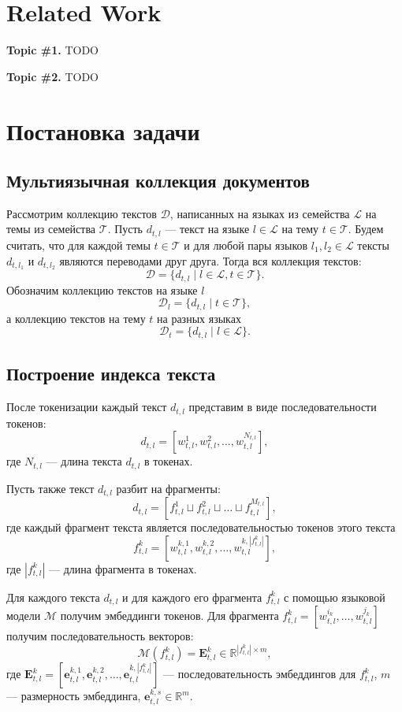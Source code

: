 \documentclass{article}
\begin{document}
\section{Related Work}\label{sec:rw}

\textbf{Topic \#1.}
TODO

\textbf{Topic \#2.}
TODO

\section{Постановка задачи}\label{sec:problem_statement}

\subsection{Мультиязычная коллекция документов}
Рассмотрим коллекцию текстов $\mathcal{D}$, написанных на языках из семейства $\mathcal{L}$ на темы из семейства $\mathcal{T}$. Пусть $d_{t, l}$ --- текст на языке $l \in \mathcal{L}$ на тему $t \in \mathcal{T}$. Будем считать, что для каждой темы $t \in \mathcal{T}$ и для любой пары языков $l_1, l_2 \in \mathcal{L}$ тексты $d_{t,l_1}$ и $d_{t,l_2}$ являются переводами друг друга. Тогда вся коллекция текстов:
$$\mathcal{D} = \{d_{t, l} \mid l \in \mathcal{L}, t \in \mathcal{T} \}.$$
Обозначим коллекцию текстов на языке $l$
$$\mathcal{D}_l = \{d_{t, l} \mid t \in \mathcal{T} \},$$
а коллекцию текстов на тему $t$ на разных языках
$$\mathcal{D}_t = \{d_{t, l} \mid l \in \mathcal{L} \}.$$

\subsection{Построение индекса текста}
После токенизации каждый текст $d_{t,l}$ представим в виде последовательности токенов:
$$d_{t,l} = [w_{t,l}^1, w_{t,l}^2, \dots, w_{t,l}^{N_{t,l}}],$$
где $N_{t,l}$ --- длина текста $d_{t,l}$ в токенах.

Пусть также текст $d_{t,l}$ разбит на фрагменты:
$$d_{t,l} = [f_{t,l}^1 \sqcup f_{t,l}^2 \sqcup \dots \sqcup f_{t,l}^{M_{t,l}}],$$
где каждый фрагмент текста является последовательностью токенов этого текста
$$f_{t,l}^k = [w_{t,l}^{k, 1}, w_{t,l}^{k, 2}, \dots, w_{t,l}^{k,|f_{t,l}^k|}],$$
где $|f_{t,l}^k|$ --- длина фрагмента в токенах.

Для каждого текста $d_{t,l}$ и для каждого его фрагмента $f_{t,l}^k$ с помощью языковой модели $\mathcal{M}$ получим эмбеддинги токенов. Для фрагмента $f_{t,l}^k = [w_{t,l}^{i_k}, \dots, w_{t,l}^{j_k}]$ получим последовательность векторов:
$$\mathcal{M}(f_{t,l}^k) = \mathbf{E}_{t,l}^k \in \mathbb{R}^{|f_{t,l}^k| \times m},$$
где $\mathbf{E}_{t,l}^k = [\mathbf{e}_{t,l}^{k,1}, \mathbf{e}_{t,l}^{k,2}, \dots, \mathbf{e}_{t,l}^{k,|f_{t,l}^k|}]$ --- последовательность эмбеддингов для $f_{t,l}^k$, $m$ --- размерность эмбеддинга, $\mathbf{e}_{t,l}^{k,s} \in \mathbb{R}^m$.
\end{document}
